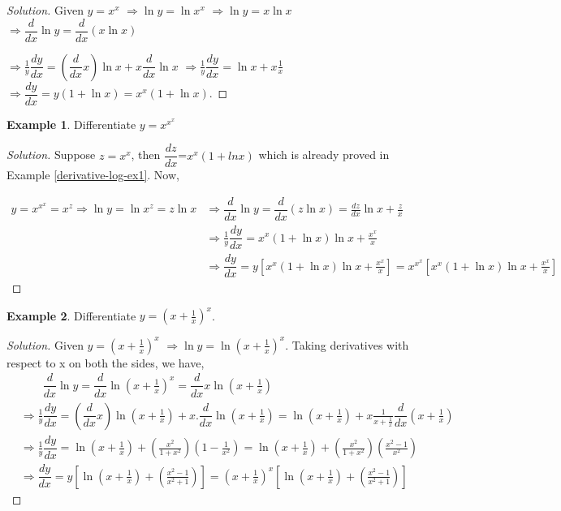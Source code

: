 \documentclass[../../main.tex]{subfiles}
\theoremstyle{definition}
\newtheorem{example}{Example}[section]
\newenvironment{solution}
    {\begin{proof}[Solution]}
    {\end{proof}}
\begin{document}
\begin{solution}
Given $y=x^x$ $\Rightarrow \ln y=\ln x^x$ $\Rightarrow \ln y= x\ln x$ $\Rightarrow \dfrac{d}{dx}\ln y= \dfrac{d}{dx}(x\ln x)$ 

$\Rightarrow \frac{1}{y}\dfrac{dy}{dx}=(\dfrac{d}{dx}x)\ln x+x\dfrac{d}{dx}\ln x$ $\Rightarrow \frac{1}{y}\dfrac{dy}{dx}=\ln x+x\frac{1}{x}$
$\Rightarrow \dfrac{dy}{dx}=y(1+\ln x)=x^x(1+\ln x)$.
\end{solution}

\begin{example}
Differentiate $y=x^{x^x}$    
\end{example}

\begin{solution}
Suppose $z=x^x$, then $\dfrac{dz}{dx}$=$x^x(1+ln x)$ which is already proved in Example \ref{derivative-log-ex1}. Now,

\begin{align*}
y=x^{x^x}=x^z \Rightarrow \ln y=\ln x^z=z\ln x &\Rightarrow \dfrac{d}{dx}\ln y=\dfrac{d}{dx}(z\ln x)=\frac{dz}{dx}\ln x+\frac{z}{x} \\ 
&\Rightarrow \frac{1}{y}\dfrac{dy}{dx}=x^x(1+\ln x)\ln x+\frac{x^x}{x} \\ 
&\Rightarrow  \dfrac{dy}{dx}=y\left[x^x(1+\ln x)\ln x+\frac{x^x}{x}\right]=x^{x^x}\left[x^x(1+\ln x)\ln x+\frac{x^x}{x}\right]
\end{align*}
\end{solution}

\begin{example}
Differentiate $y=(x+\frac{1}{x})^x$.    
\end{example}

\begin{solution}
Given $y=(x+\frac{1}{x})^x$ $\Rightarrow \ln y = \ln (x+\frac{1}{x})^x$. Taking derivatives with respect to x on both the sides, we have,
\begin{align*}
    &\qquad \dfrac{d}{dx}\ln y = \dfrac{d}{dx}\ln \left(x+\frac{1}{x}\right)^x = \dfrac{d}{dx}x\ln \left(x+\frac{1}{x}\right) \\
    &\Rightarrow \frac{1}{y}\dfrac{dy}{dx}=(\dfrac{d}{dx}x)\ln \left(x+\frac{1}{x}\right)+x.\dfrac{d}{dx}\ln \left(x+\frac{1}{x}\right)=\ln \left(x+\frac{1}{x}\right)+x\frac{1}{x+\frac{1}{x}}\dfrac{d}{dx}\left(x+\frac{1}{x}\right) \\
    &\Rightarrow \frac{1}{y}\dfrac{dy}{dx}=\ln \left(x+\frac{1}{x}\right)+\left(\frac{x^2}{1+x^2}\right)\left(1-\frac{1}{x^2}\right) = \ln \left(x+\frac{1}{x}\right)+\left(\frac{x^2}{1+x^2}\right)\left(\frac{x^2-1}{x^2}\right) \\
    &\Rightarrow \dfrac{dy}{dx}= y\left[\ln \left(x+\frac{1}{x}\right)+\left(\frac{x^2-1}{x^2+1}\right)\right] = \left(x+\frac{1}{x}\right)^x\left[\ln \left(x+\frac{1}{x}\right)+\left(\frac{x^2-1}{x^2+1}\right)\right]
\end{align*}
\end{solution}
\end{document}
